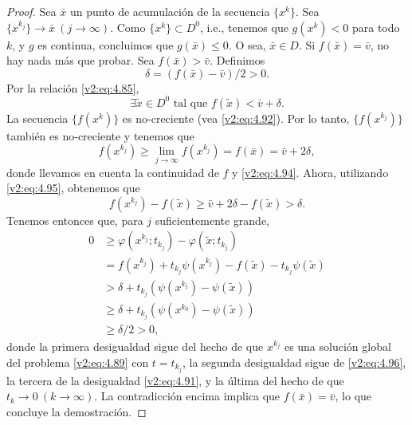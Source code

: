 \begin{proof}
    Sea $\bar{x}$ un punto de acumulación de la secuencia $\{x^k\}$. Sea $\{x^{k_j}\} \to \bar{x} \ (j \to \infty)$. Como $\{x^k\} \subset D^0$, i.e., tenemos que $g(x^k) < 0$ para todo $k$, y $g$ es continua, concluimos que $g(\bar{x}) \le 0$. O sea, $\bar{x} \in D$.
    Si $f(\bar{x}) = \bar{v}$, no hay nada más que probar. Sea $f(\bar{x}) > \bar{v}$. Definimos
    \begin{equation}
        \delta = (f(\bar{x}) - \bar{v})/2 > 0.
        \label{v2:eq:4.94}
    \end{equation}
    Por la relación \eqref{v2:eq:4.85},
    \begin{equation}
        \exists \tilde{x} \in D^0 \text{ tal que } f(\tilde{x}) < \bar{v} + \delta.
        \label{v2:eq:4.95}
    \end{equation}
    La secuencia $\{f(x^k)\}$ es no-creciente (vea \eqref{v2:eq:4.92}). Por lo tanto, $\{f(x^{k_j})\}$ también es no-creciente y tenemos que
    \[
        f(x^{k_j}) \ge \lim_{j \to \infty} f(x^{k_j}) = f(\bar{x}) = \bar{v} + 2\delta,
    \]
    donde llevamos en cuenta la continuidad de $f$ y \eqref{v2:eq:4.94}.
    Ahora, utilizando \eqref{v2:eq:4.95}, obtenemos que
    \begin{equation}
        f(x^{k_j}) - f(\tilde{x}) \ge \bar{v} + 2\delta - f(\tilde{x}) > \delta.
        \label{v2:eq:4.96}
    \end{equation}
    Tenemos entonces que, para $j$ suficientemente grande,
    \begin{align*}
        0 &\ge \varphi(x^{k_j}; t_{k_j}) - \varphi(\tilde{x}; t_{k_j}) \\
        &= f(x^{k_j}) + t_{k_j}\psi(x^{k_j}) - f(\tilde{x}) - t_{k_j}\psi(\tilde{x}) \\
        &> \delta + t_{k_j}(\psi(x^{k_j}) - \psi(\tilde{x})) \\
        &\ge \delta + t_{k_j}(\psi(x^{k_0}) - \psi(\tilde{x})) \\
        &\ge \delta/2 > 0,
    \end{align*}
    donde la primera desigualdad sigue del hecho de que $x^{k_j}$ es una solución global del problema \eqref{v2:eq:4.89} con $t = t_{k_j}$, la segunda desigualdad sigue de \eqref{v2:eq:4.96}, la tercera de la desigualdad \eqref{v2:eq:4.91}, y la última del hecho de que $t_k \to 0 \ (k \to \infty)$.
    La contradicción encima implica que $f(\bar{x}) = \bar{v}$, lo que concluye la demostración.
\end{proof}